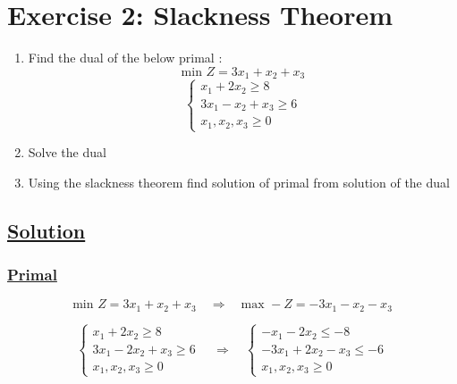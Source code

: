 \vspace{1.5cm}
\section*{Exercise 2: Slackness Theorem}
\begin{enumerate}
    \item Find the dual of the below primal :\\[0.15cm]
\[\text{min } Z = 3x_1 + x_2 + x_3\]
\vspace{-0.25cm}
\[
\left\{
\begin{array}{l}
    x_{1} + 2x_{2}  \geq 8 \\
    3x_{1} - x_{2} + x_{3} \geq 6 \\
    x_{1}, x_{2}, x_{3}\geq 0
\end{array}
\right.
\]

\vspace{0.15cm}
    \item Solve the dual
    \item Using the slackness theorem find solution of primal from solution of the dual
\end{enumerate}

\vspace{1cm}

\subsection*{\underline{Solution}}

\vspace{0.25cm}
\subsubsection*{\underline{Primal}}
\[\text{min } Z = 3x_1 + x_2 + x_3 \quad\Longrightarrow\quad  \text{max } -Z = -3x_1 - x_2 - x_3\]

\vspace{0.1cm}
\[
\left\{
\begin{array}{l}
    x_{1} + 2x_{2}  \geq 8 \\
    3x_{1} - 2x_{2} + x_{3} \geq 6 \\
    x_{1}, x_{2}, x_{3}\geq 0
\end{array}
\right.
\quad\Longrightarrow\quad
\left\{
\begin{array}{l}
    -x_{1} - 2x_{2}  \leq -8 \\
    -3x_{1} + 2x_{2} - x_{3} \leq -6 \\
    x_{1}, x_{2}, x_{3}\geq 0
\end{array}
\right.
\]


